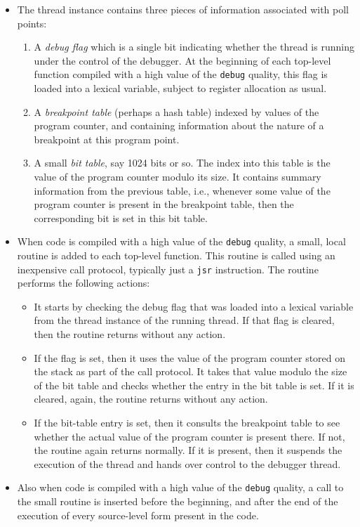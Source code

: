 \begin{itemize}
\item The thread instance contains three pieces of information
  associated with poll points:
  \begin{enumerate}
  \item A \emph{debug flag} which is a single bit indicating whether
    the thread is running under the control of the debugger.  At the
    beginning of each top-level function compiled with a high value of
    the \texttt{debug} quality, this flag is loaded into a lexical
    variable, subject to register allocation as usual.
  \item A \emph{breakpoint table} (perhaps a hash table) indexed by values of
    the program counter, and containing information about the nature
    of a breakpoint at this program point.
  \item A small \emph{bit table}, say 1024 bits or so.  The index into
    this table is the value of the program counter modulo its size.
    It contains summary information from the previous table, i.e.,
    whenever some value of the program counter is present in the
    breakpoint table, then the corresponding bit is set in this bit
    table.
  \end{enumerate}
\item When code is compiled with a high value of the \texttt{debug}
  quality, a small, local routine is added to each top-level
  function.  This routine is called using an inexpensive call
  protocol, typically just a \texttt{jsr} instruction.  The routine
  performs the following actions:
  \begin{itemize}
  \item It starts by checking the debug flag that was loaded into a
    lexical variable from the thread instance of the running thread.
    If that flag is cleared, then the routine returns without any
    action.
  \item If the flag is set, then it uses the value of the program
    counter stored on the stack as part of the call protocol.  It
    takes that value modulo the size of the bit table and checks
    whether the entry in the bit table is set.  If it is cleared,
    again, the routine returns without any action.
  \item If the bit-table entry is set, then it consults the breakpoint
    table to see whether the actual value of the program counter is
    present there.  If not, the routine again returns normally.  If it
    is present, then it suspends the execution of the thread and hands
    over control to the debugger thread.
  \end{itemize}
\item Also when code is compiled with a high value of the
  \texttt{debug} quality, a call to the small routine is inserted
  before the beginning, and after the end of the execution of every
  source-level form present in the code.
\end{itemize}

